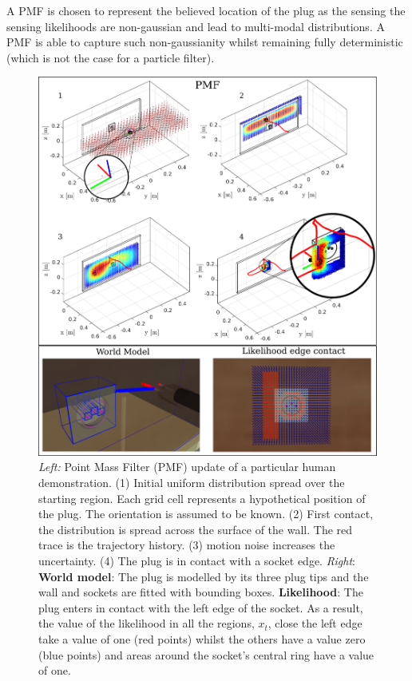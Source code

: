 \documentclass[final,3p,times,twocolumn]{elsarticle}
\begin{document}
A PMF is chosen to represent the believed location of the plug as the sensing 
the sensing likelihoods are non-gaussian and lead to multi-modal distributions.  
A PMF is able to capture such non-gaussianity whilst remaining fully deterministic 
(which is not the case for a particle filter).

\begin{figure}
 \centering
   \includegraphics[width=\textwidth]{./Figures/PMF/pmf_likelihood_v2.pdf}
   \caption{\textit{Left:} Point Mass Filter (PMF) update of a particular human demonstration. (1) Initial uniform distribution spread over the starting 
   region. Each grid cell represents a hypothetical position of the plug. The orientation is assumed to be known. (2) First contact, the distribution 
   is spread across the surface of the wall. The red trace is the trajectory history. (3) motion noise increases the uncertainty. (4) The plug is in contact with a socket edge.
   \textit{Right}: \textbf{World model}: The plug is modelled by its three plug tips and the wall and sockets are fitted with bounding boxes.
   \textbf{Likelihood}: The plug enters in contact with the left edge of the socket. As a result, the value of the likelihood in all the regions, $x_t$, close the left edge take 
   a value of one (red points)  whilst the others have a value zero (blue points) and areas around the socket's central 
   ring have a value of one. }
  \label{fig:PMF}
\end{figure}
\end{document}

